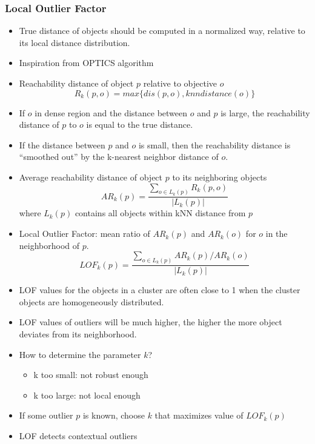 \documentclass[../notes.tex]{subfiles}
\begin{document}
\subsubsection{Local Outlier Factor}
\begin{itemize}
  \item True distance of objects should be computed in a normalized way, relative to its local distance distribution.
  \item Inspiration from OPTICS algorithm
  \item Reachability distance of object $p$ relative to objective $o$
  $$R_k(p, o) = max\{dis(p, o), knndistance(o)\}$$
  \item If $o$ in dense region and the distance between $o$ and $p$ is large, the reachability distance of $p$ to $o$ is equal to the true distance.
  \item If the distance between $p$ and $o$ is small, then the reachability distance is ``smoothed out'' by the k-nearest neighbor distance of $o$.
  \item Average reachability distance of object $p$ to its neighboring objects
  $$AR_k(p) = \frac{\sum_{o \in L_k(p)} R_k(p, o)}{|L_k(p)|}$$
  where $L_k(p)$ contains all objects within kNN distance from $p$
  \item Local Outlier Factor: mean ratio of $AR_k(p)$ and $AR_k(o)$ for $o$ in the neighborhood of $p$.
  $$LOF_k(p) = \frac{\sum_{o \in L_k(p)}AR_k(p) / AR_k(o)}{|L_k(p)|}$$
  \item LOF values for the objects in a cluster are often close to 1 when the cluster objects are homogeneously distributed.
  \item LOF values of outliers will be much higher, the higher the more object deviates from its neighborhood.
  \item How to determine the parameter $k$?
  \begin{itemize}
    \item k too small: not robust enough
    \item k too large: not local enough
  \end{itemize}
  \item If some outlier $p$ is known, choose $k$ that maximizes value of $LOF_k(p)$
  \item LOF detects contextual outliers
\end{itemize}

\newpage
\end{document}
